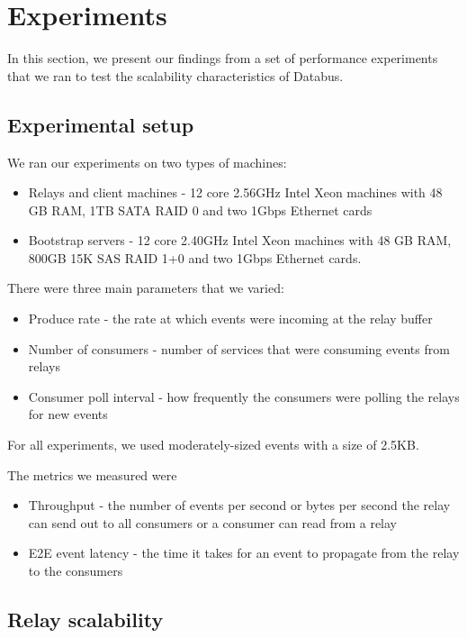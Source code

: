 \section{Experiments}

In this section, we present our findings from a set of performance experiments that we ran to test the scalability characteristics of Databus. 

\subsection{Experimental setup}

We ran our experiments on two types of machines:

\begin{itemize}
\item Relays and client machines - 12 core 2.56GHz Intel Xeon machines with 48 GB RAM, 1TB SATA RAID 0 and two 1Gbps Ethernet cards
\item Bootstrap servers - 12 core 2.40GHz Intel Xeon machines with 48 GB RAM, 800GB 15K SAS RAID 1+0 and two 1Gbps Ethernet cards.
\end{itemize}

There were three main parameters that we varied:

\begin{itemize}
\item Produce rate - the rate at which events were incoming at the relay buffer
\item Number of consumers - number of services that were consuming events from relays
\item Consumer poll interval - how frequently the consumers were polling the relays for new events
\end{itemize}

For all experiments, we used moderately-sized events with a size of 2.5KB.

The metrics we measured were

\begin{itemize}
\item Throughput - the number of events per second or bytes per second the relay can send out to all consumers or a consumer can read from a relay
\item E2E event latency - the time it takes for an event to propagate from the relay to the consumers
\end{itemize}

\subsection{Relay scalability}

